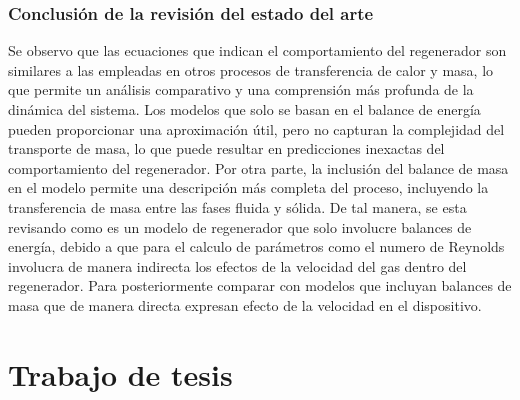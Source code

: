 \documentclass[12pt,letterpaper,final]{article}%
\begin{document}
\subsubsection{Conclusión de la revisión del estado del arte}

Se observo que las ecuaciones que indican el comportamiento del regenerador son similares a las empleadas en otros procesos de transferencia de calor y masa\cite{Kilkovsky2020}\cite{Kulkarni1992}\cite{SADRAMELI2016}, lo que permite un análisis comparativo y una comprensión más profunda de la dinámica del sistema.
Los modelos que solo se basan en el balance de energía pueden proporcionar una aproximación útil, pero no capturan la complejidad del transporte de masa, lo que puede resultar en predicciones inexactas del comportamiento del regenerador. 
\newline 
Por otra parte, la inclusión del balance de masa en el modelo permite una descripción más completa del proceso, incluyendo la transferencia de masa entre las fases fluida y sólida\cite{Ramachadran1984}. De tal manera, se esta revisando como es un modelo de regenerador que solo involucre balances de energía, debido a que para el calculo de parámetros como el numero de Reynolds involucra de manera indirecta los efectos de la velocidad del gas dentro del regenerador. Para posteriormente comparar con modelos que incluyan balances de masa que de manera directa expresan efecto de la velocidad en el dispositivo.
\section{Trabajo de tesis}
\end{document}
